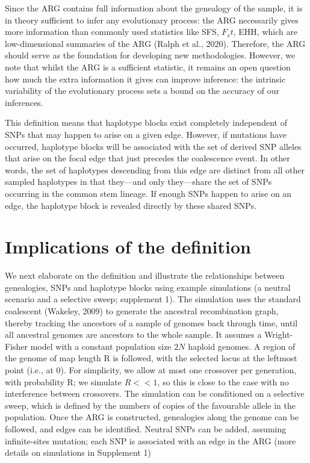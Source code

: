\documentclass[twocolumn]{bmcart}%
\begin{document}
\begin{strip}
\begin{tcolorbox}[
  colback=blue!1!white,width=\columnwidth,colframe=blue!50!black,title= Box 1: Ancestral Recombination Graph (ARG),width=6.7in]
\begin{multicols}{2}
\small{Since the ARG contains full information about the genealogy of the sample, it is in theory sufficient to infer any evolutionary process: the ARG necessarily gives more information than commonly used statistics like SFS, $F_st$, EHH, which are low-dimensional summaries of the ARG (Ralph et al., 2020). Therefore, the ARG should serve as the foundation for developing new methodologies. However, we note that whilst the ARG is a sufficient statistic, it remains an open question how much the extra information it gives can improve inference: the intrinsic variability of the evolutionary process sets a bound on the accuracy of our inferences.}
\end{multicols}

\end{tcolorbox}
\end{strip}

This definition means that haplotype blocks exist completely independent of SNPs that may happen to arise on a given edge. However, if mutations have occurred, haplotype blocks will be associated with the set of derived SNP alleles that arise on the focal edge that just precedes the coalescence event. In other words, the set of haplotypes descending from this edge are distinct from all other sampled haplotypes in that they—and only they—share the set of SNPs occurring in the common stem lineage. If enough SNPs happen to arise on an edge, the haplotype block is revealed directly by these shared SNPs.

\section*{Implications of the definition}
We next elaborate on the definition and illustrate the relationships between genealogies, SNPs and haplotype blocks using example simulations (a neutral scenario and a selective sweep; supplement 1). The simulation uses the standard coalescent (Wakeley, 2009) to generate the ancestral recombination graph, thereby tracking the ancestors of a sample of genomes back through time, until all ancestral genomes are ancestors to the whole sample. It assumes a Wright-Fisher model with a constant population size $2N$ haploid genomes. A region of the genome of map length R is followed, with the selected locus at the leftmost point (i.e., at 0). For simplicity, we allow at most one crossover per generation, with probability R; we simulate $R << 1$, so this is close to the case with no interference between crossovers. The simulation can be conditioned on a selective sweep, which is defined by the numbers of copies of the favourable allele in the population. Once the ARG is constructed, genealogies along the genome can be followed, and edges can be identified. Neutral SNPs can be added, assuming infinite-sites mutation; each SNP is associated with an edge in the ARG (more details on simulations in Supplement 1)
\end{document}
